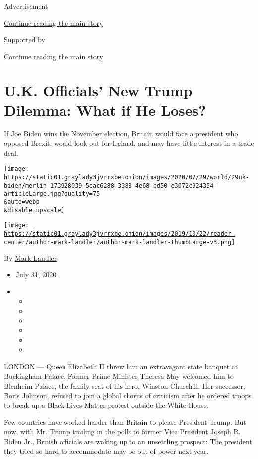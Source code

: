 Advertisement

\protect\hyperlink{after-top}{Continue reading the main story}

Supported by

\protect\hyperlink{after-sponsor}{Continue reading the main story}

\hypertarget{uk-officials-new-trump-dilemma-what-if-he-loses}{%
\section{U.K. Officials' New Trump Dilemma: What if He
Loses?}\label{uk-officials-new-trump-dilemma-what-if-he-loses}}

If Joe Biden wins the November election, Britain would face a president
who opposed Brexit, would look out for Ireland, and may have little
interest in a trade deal.

\texttt{[image: https://static01.graylady3jvrrxbe.onion/images/2020/07/29/world/29uk-biden/merlin\_173928039\_5eac6288-3388-4e68-bd50-e3072c924354-articleLarge.jpg?quality=75\\\&auto=webp\\\&disable=upscale]}

\href{https://www.nytimes3xbfgragh.onion/by/mark-landler}{\texttt{[image: https://static01.graylady3jvrrxbe.onion/images/2019/10/22/reader-center/author-mark-landler/author-mark-landler-thumbLarge-v3.png]}}

By \href{https://www.nytimes3xbfgragh.onion/by/mark-landler}{Mark
Landler}

\begin{itemize}
\item
  July 31, 2020
\item
  \begin{itemize}
  \item
  \item
  \item
  \item
  \item
  \item
  \end{itemize}
\end{itemize}

LONDON --- Queen Elizabeth II threw him an extravagant state banquet at
Buckingham Palace. Former Prime Minister Theresa May welcomed him to
Blenheim Palace, the family seat of his hero, Winston Churchill. Her
successor, Boris Johnson, refused to join a global chorus of criticism
after he ordered troops to break up a Black Lives Matter protest outside
the White House.

Few countries have worked harder than Britain to please President Trump.
But now, with Mr. Trump trailing in the polls to former Vice President
Joseph R. Biden Jr., British officials are waking up to an unsettling
prospect: The president they tried so hard to accommodate may be out of
power next year.

